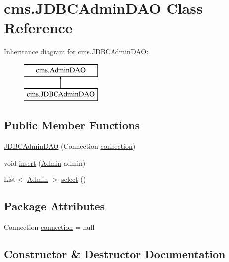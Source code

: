 \hypertarget{classcms_1_1_j_d_b_c_admin_d_a_o}{}\section{cms.\+J\+D\+B\+C\+Admin\+D\+AO Class Reference}
\label{classcms_1_1_j_d_b_c_admin_d_a_o}
Inheritance diagram for cms.\+J\+D\+B\+C\+Admin\+D\+AO\+:\begin{figure}[H]
\begin{center}
\leavevmode
\includegraphics[height=2.000000cm]{classcms_1_1_j_d_b_c_admin_d_a_o}
\end{center}
\end{figure}
\subsection*{Public Member Functions}
\begin{DoxyCompactItemize}
\item 
\mbox{\hyperlink{classcms_1_1_j_d_b_c_admin_d_a_o_aa81abd0562cf5876cc32a62150c77433}{J\+D\+B\+C\+Admin\+D\+AO}} (Connection \mbox{\hyperlink{classcms_1_1_j_d_b_c_admin_d_a_o_a970f1be51071c85c0b1e55b45f21bcad}{connection}})
\item 
void \mbox{\hyperlink{classcms_1_1_j_d_b_c_admin_d_a_o_a63cbff25e5bc997e5976e37d2b809270}{insert}} (\mbox{\hyperlink{classcms_1_1_admin}{Admin}} admin)
\item 
List$<$ \mbox{\hyperlink{classcms_1_1_admin}{Admin}} $>$ \mbox{\hyperlink{classcms_1_1_j_d_b_c_admin_d_a_o_a4cfb093895262f1b8a4ac7695cf50d74}{select}} ()
\end{DoxyCompactItemize}
\subsection*{Package Attributes}
\begin{DoxyCompactItemize}
\item 
Connection \mbox{\hyperlink{classcms_1_1_j_d_b_c_admin_d_a_o_a970f1be51071c85c0b1e55b45f21bcad}{connection}} = null
\end{DoxyCompactItemize}


\subsection{Constructor \& Destructor Documentation}
\mbox{\label{classcms_1_1_j_d_b_c_admin_d_a_o_aa81abd0562cf5876cc32a62150c77433}} 
